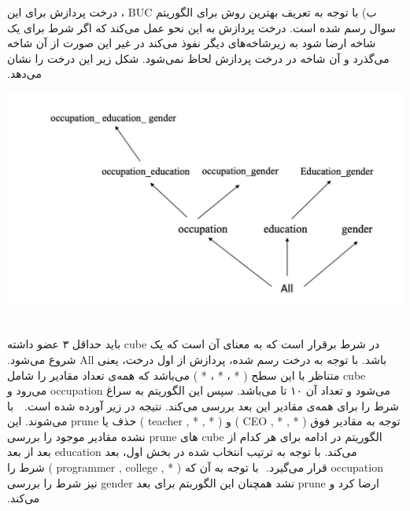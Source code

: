 ‫\vspace{1cm}
‫
‫ب) با توجه به تعریف بهترین روش برای الگوریتم BUC ، درخت پردازش برای این سوال رسم شده است. درخت پردازش به این نحو عمل می‌کند که اگر شرط  برای یک شاخه ارضا شود به زیرشاخه‌های دیگر نفوذ می‌کند در غیر این صورت از آن شاخه می‌گذرد و آن شاخه در درخت پردازش لحاظ نمی‌شود. شکل زیر این درخت را نشان می‌دهد. 
‫
‫\begin{center}
‫\includegraphics[scale=0.35]{figs/tree.png}
‫\end{center}
‫
‫در  شرط  برقرار است که به معنای آن است که یک cube باید حداقل ۳ عضو داشته باشد. با توجه به درخت رسم شده، پردازش از اول درخت، یعنی All شروع می‌شود. cube متناظر با این سطح ( * ، * ، * ) می‌باشد که همه‌ی تعداد مقادیر را شامل می‌شود و تعداد آن ۱۰ تا می‌باشد. سپس این الگوریتم به سراغ occupation می‌رود و شرط  را برای همه‌ی مقادیر این بعد بررسی می‌کند. نتیجه در زیر آورده شده است.
‫
‫
‫با توجه به مقادیر فوق ( * , * , CEO ) و ( * , * , teacher ) حذف یا prune می‌شوند. \newline
‫این الگوریتم در ادامه برای هر کدام از cube های prune نشده مقادیر موجود را بررسی می‌‌کند. با توجه به ترتیب انتخاب شده در بخش اول، بعد education بعد از بعد occupation قرار می‌گیرد. \newline
‫
‫با توجه به آن که ( * , programmer , college ) شرط را ارضا کرد و prune نشد همچنان این الگوربتم برای بعد gender نیز شرط را بررسی می‌کند. 
‫

